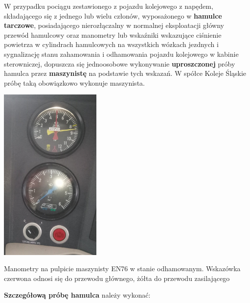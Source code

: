 W przypadku pociągu zestawionego z pojazdu kolejowego z napędem, składającego się z jednego lub wielu członów, wyposażonego w\textbf{ hamulce tarczowe}, posiadającego nierozłączalny w normalnej eksploatacji główny przewód hamulcowy oraz manometry lub wskaźniki wskazujące ciśnienie powietrza w cylindrach hamulcowych na wszystkich wózkach jezdnych i sygnalizację stanu zahamowania i odhamowania pojazdu kolejowego w kabinie sterowniczej, dopuszcza się jednoosobowe wykonywanie \textbf{uproszczonej} próby hamulca przez \textbf{maszynistę} na podstawie tych wskazań. W spółce Koleje Śląskie próbę taką obowiązkowo wykonuje maszynista.
\begin{marginfigure}
	\includegraphics[width=5cm]{skryptkierownik-img/manometry-odhamowane.jpg}
	\caption{Manometry na pulpicie maszynisty EN76 w stanie odhamowanym. Wskazówka czerwona odnosi się do przewodu głównego, żółta do przewodu zasilającego}
\end{marginfigure}
\textbf{Szczegółową próbę hamulca} należy wykonać: 
